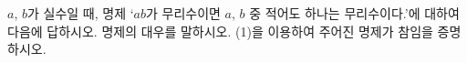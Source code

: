 $a$, $b$가 실수일 때, 명제 `$ab$가 무리수이면 $a$, $b$ 중 적어도 하나는 무리수이다.'에 대하여 다음에 답하시오.
 명제의 대우를 말하시오.
 (1)을 이용하여 주어진 명제가 참임을 증명하시오.
